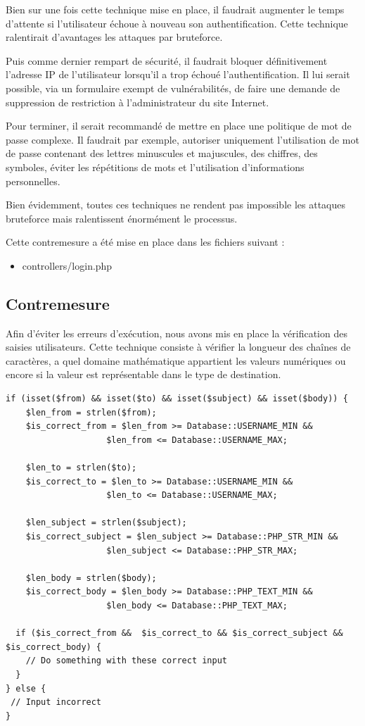 \documentclass[12pt]{article}
\begin{document}
Bien sur une fois cette technique mise en place, il faudrait augmenter le temps d'attente si l'utilisateur échoue à nouveau son authentification. Cette technique ralentirait d'avantages les attaques par bruteforce. 

Puis comme dernier rempart de sécurité, il faudrait bloquer définitivement l'adresse IP de l'utilisateur lorsqu'il a trop échoué l'authentification. Il lui serait possible, via un formulaire exempt de vulnérabilités, de faire une demande de suppression de restriction à l'administrateur du site Internet.

Pour terminer, il serait recommandé de mettre en place une politique de mot de passe complexe. Il faudrait par exemple,  autoriser uniquement l'utilisation de mot de passe contenant des lettres minuscules et majuscules, des chiffres, des symboles, éviter les répétitions de mots et l'utilisation d'informations personnelles. 

Bien évidemment, toutes ces techniques ne rendent pas impossible les attaques bruteforce mais ralentissent énormément le processus.

Cette contremesure a été mise en place dans les fichiers suivant :

\begin{itemize}
\item controllers/login.php
\end{itemize}

\newpage
\subsection{Contremesure}\label{c7}

Afin d'éviter les erreurs d'exécution, nous avons mis en place la vérification des saisies utilisateurs. Cette technique consiste à vérifier la longueur des chaînes de caractères, a quel domaine mathématique appartient les valeurs numériques ou encore si la valeur est représentable dans le type de destination.

\begin{lstlisting}[style=JAVA]
if (isset($from) && isset($to) && isset($subject) && isset($body)) {
    $len_from = strlen($from);
    $is_correct_from = $len_from >= Database::USERNAME_MIN && 
                    $len_from <= Database::USERNAME_MAX;
                            
    $len_to = strlen($to);
    $is_correct_to = $len_to >= Database::USERNAME_MIN && 
                    $len_to <= Database::USERNAME_MAX;

    $len_subject = strlen($subject);
    $is_correct_subject = $len_subject >= Database::PHP_STR_MIN && 
                    $len_subject <= Database::PHP_STR_MAX;
                            
    $len_body = strlen($body);
    $is_correct_body = $len_body >= Database::PHP_TEXT_MIN && 
                    $len_body <= Database::PHP_TEXT_MAX;

  if ($is_correct_from &&  $is_correct_to && $is_correct_subject && $is_correct_body) {
    // Do something with these correct input
  }
} else {
 // Input incorrect
}
\end{lstlisting}
\end{document}
